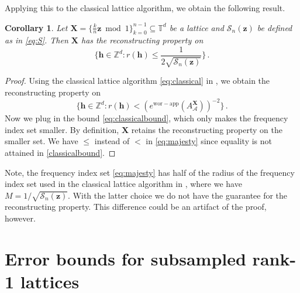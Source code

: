 \documentclass[a4paper]{amsart}
\newtheorem{corollary}[theorem]{Corollary}
\newcommand{\ewc}{e^{\mathrm{wor-app}}}
\newcommand{\modone}{\bmod{}1}
\begin{document}
Applying this to the classical lattice algorithm, we obtain the following result.

\begin{corollary}\label{classicalrecon} Let $\bm X = \{\frac kn\bm z\modone\}_{k=0}^{n-1}\subseteq\mathds T^d$ be a lattice and $\mathcal S_n(\bm z)$ be defined as in \eqref{eq:S}.
    Then $\bm X$ has the reconstructing property on
    \begin{equation}\label{eq:majesty}
        \Big\{\bm h\in\mathds Z^d : r(\bm h) \le \frac{1}{2 \sqrt{\mathcal S_n(\bm z)}} \Big\} \,.
    \end{equation}
\end{corollary} 

\begin{proof} Using the classical lattice algorithm \eqref{eq:classical} in , we obtain the reconstructing property on
    \begin{equation*}
        \Big\{\bm h\in\mathds Z^d : r(\bm h) < (\ewc(A_{\mathcal A}^{\bm X}))^{-2}\Big\} \,.
    \end{equation*}
    Now we plug in the bound \eqref{eq:classicalbound}, which only makes the frequency index set smaller.
    By definition, $\bm X$ retains the reconstructing property on the smaller set.
    We have $\le$ instead of $<$ in \eqref{eq:majesty} since equality is not attained in \eqref{classicalbound}.
\end{proof} 

Note, the frequency index set \eqref{eq:majesty} has half of the radius of the frequency index set used in the classical lattice algorithm in , where we have $M = 1/\sqrt{\mathcal S_n(\bm z)}$.
With the latter choice we do not have the guarantee for the reconstructing property.
This difference could be an artifact of the proof, however.

 \section{Error bounds for subsampled rank-1 lattices}\label{sec:sub} 
\end{document}
